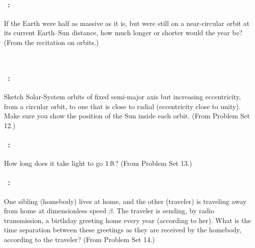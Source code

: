 \documentclass[12pt]{article} 
\begin{document}
\vfill

\paragraph{\problemname~\theproblem:}%
If the Earth were half as massive as it is, but were still
on a near-circular orbit at its current Earth--Sun distance, how much
longer or shorter would the year be?
(From the recitation on orbits.)

\vfill
~
\clearpage

\paragraph{\problemname~\theproblem:}%
Sketch Solar-System orbits of fixed semi-major axis but increasing
eccentricity, from a circular orbit, to one that is close to radial
(eccentricity close to unity). Make sure you show the position of
the Sun inside each orbit.
(From Problem Set 12.)

\vfill

\paragraph{\problemname~\theproblem:}%
How long does it take light to go $1\,\mathrm{ft}$?
(From Problem Set 13.)

\vfill

\paragraph{\problemname~\theproblem:}%
One sibling (homebody) lives at home, and the other (traveler) is
traveling away from home at dimensionless speed $\beta$. The traveler
is sending, by radio transmission, a birthday greeting home every year
(according to her). What is the time separation between these
greetings as they are received by the homebody, according to the
traveler?
(From Problem Set 14.)

\vfill
~
\end{document}
